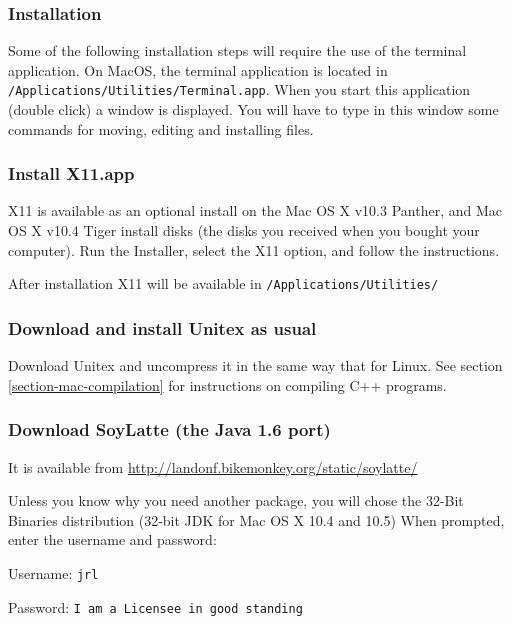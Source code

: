 \clearpage

\subsubsection{Installation}
\noindent Some of the following installation steps will require the use of the
terminal application. On MacOS, the terminal application is located in 
\verb+/Applications/Utilities/Terminal.app+.  When you start this application
(double click) a window is displayed. You will have to type in this window 
some commands for moving, editing and installing files.

\subsubsection{Install X11.app}
\noindent X11 is available as an optional install on the Mac OS X v10.3 
Panther, and Mac OS X v10.4 Tiger install disks (the disks you received 
when you bought your computer). Run the Installer, 
select the X11 option, and follow the instructions.

\bigskip
\noindent After installation X11 will be available in
\verb+/Applications/Utilities/+


\subsubsection{Download and install Unitex as usual}
\noindent Download Unitex and uncompress it in the same way that for Linux.
See section \ref{section-mac-compilation} for instructions on compiling
C++ programs.


\subsubsection{Download SoyLatte (the Java 1.6 port)} 
\noindent It is available from
\url{http://landonf.bikemonkey.org/static/soylatte/} 

\bigskip
\noindent Unless you know why you need another package, you will chose 
the 32-Bit Binaries distribution (32-bit JDK for Mac OS X 10.4 and 10.5) 
When prompted, enter the username and password: 

\bigskip
Username: \verb+jrl+

Password: \verb+I am a Licensee in good standing+



